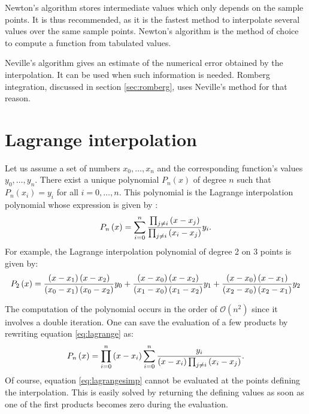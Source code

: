 Newton's algorithm stores intermediate values which only depends
on the sample points. It is thus recommended, as it is the fastest
method to interpolate several values over the same sample points.
Newton's algorithm is the method of choice to compute a function
from tabulated values.

Neville's algorithm gives an estimate of the numerical error
obtained by the interpolation. It can be used when such
information is needed. Romberg integration, discussed in section
\ref{sec:romberg}, uses Neville's method for that reason.

\section{Lagrange interpolation}
\label{sec:lagrange}
 Let us assume a set of numbers
$x_0,\ldots,x_n$ and the corresponding function's values
$y_0,\ldots,y_n$. There exist a unique polynomial
$P_n\left(x\right)$ of degree $n$ such that
$P_n\left(x_i\right)=y_i$ for all $i=0,\ldots,n$. This polynomial
is the Lagrange interpolation polynomial whose expression is given
by \cite{Knuth2}:
\begin{equation}
\label{eq:lagrange} P_n\left(x\right)=\sum_{i=0}^n{\prod_{j\neq
i}\left(x-x_j\right) \over\prod_{j\neq i}\left(x_i-x_j\right)}y_i.
\end{equation}
For example, the Lagrange interpolation polynomial of degree 2 on
3 points is given by:
\begin{equation}
P_2\left(x\right)={\left(x-x_1\right)\left(x-x_2\right)\over
\left(x_0-x_1\right)\left(x_0-x_2\right)}y_0+{\left(x-x_0\right)\left(x-x_2\right)\over
\left(x_1-x_0\right)\left(x_1-x_2\right)}y_1+{\left(x-x_0\right)\left(x-x_1\right)\over
\left(x_2-x_0\right)\left(x_2-x_1\right)}y_2
\end{equation}

The computation of the polynomial occurs in the order of $\mathcal{O}(n^2)$ since it involves a double iteration.
One can save the evaluation of a few products by rewriting equation \ref{eq:lagrange} as:
\begin{equation}
\label{eq:lagrangesimp}
P_n\left(x\right)=\prod_{i=0}^n\left(x-x_i\right)\sum_{i=0}^n{y_i
\over\left(x-x_i\right)\prod_{j\neq i}\left(x_i-x_j\right)}.
\end{equation}
Of course, equation \ref{eq:lagrangesimp} cannot be evaluated at
the points defining the interpolation. This is easily solved by
returning the defining values as soon as one of the first products
becomes zero during the evaluation.

